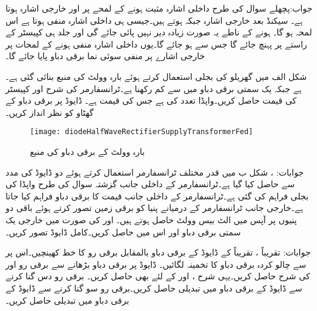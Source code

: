 جواب:پچھلے سوال کی طرح داخلی اشارہ مثبت ہونے کے لمحے پر  اور خارجی اشارہ  ہوتا ہے۔ سیکنڈ بعد خارجی اشارہ  جبکہ  ہوتے ہیں۔جیسی ہی داخلی اشارہ منفی ہوتا ہے اس لمحہ  ہو گا۔ ہونے کے ناطے یہ صورت زیادہ دیر نہیں پائی جائے گی اور جلد ہی کپیسٹر  کے راستے  پر پہنچ جائے گا جس سے  ہو جائے گا۔یوں داخلی اشارہ منفی ہونے کے لمحات پر خارجی اشارے پر منفی سوئی نما برقی دباو پایا جائے گا۔

شکل  الف میں گھریلو  کی بجلی استعمال کرتے ہوئے بارہ وولٹ کی منبع بنائی گئی ہے۔ ہے جبکہ یک سمتی برقی دباو میں   سے کم رکھنا ہے۔ٹرانسفارمر کی شرح  اور کپیسٹر کی قیمت حاصل کریں۔واپڈا  تعدد کی  ہے جس کی  قیمت  ہے۔ ڈایوڈ پر برقی دباو کے گھٹاو کو نظر انداز کریں۔
\begin{figure}
\centering
\texttt{[image: diodeHalfWaveRectifierSupplyTransformerFed]}
\caption{بارہ وولٹ کے برقی دباو کی منبع}
\label{شکل_بارہ_وولٹ-منبع}
\end{figure}

جوابات: ،  
شکل  ب میں قدر مختلف ٹرانسفارمر استعمال کرتے ہوئے دو ڈایوڈ کی مدد سے  حاصل کیا گیا ہے۔ٹرانسفارمر کے داخلی جانب گزشتہ سوال کی طرح واپڈا کی بجلی فراہم کی گئی ہے۔ٹرانسفارمر کے داخلی جانب   قیمت کا برقی دباو فراہم کیا جاتا ہے۔خارجی جانب ٹرانسفارمر کے درمیانے پنیا کو برقی زمین تصور کرتے ہوئے  باقی دو پنیوں پر آپس میں الٹ بیس وولٹ حاصل ہوتے ہیں۔ اور  کی صورت میں خارجی یک سمتی برقی دباو  اور اس میں  حاصل کریں۔کامل ڈایوڈ تصور کریں۔

جوابات: تقریباً  ، تقریباً 
 کے ڈایوڈ کے برقی دباو بالمقابل برقی رو کا خط کھینچیں۔اس پر سے چالو کردہ برقی دباو کا تخمینہ لگائیں۔ 
ڈایوڈ پر برقی دباو  بڑھانے سے برقی رو  اور  کی شرح حاصل کریں۔یہی شرح ،  اور  کے لئے بھی حاصل کریں۔   
برقی رو دس گنا کرنے سے ڈایوڈ کے برقی دباو میں تبدیلی حاصل کریں۔برقی رو سو گنا کرنے سے ڈایوڈ کے برقی دباو میں تبدیلی حاصل کریں۔

